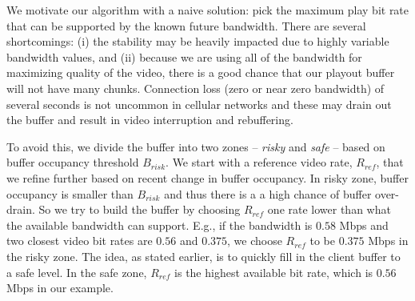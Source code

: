 We motivate our algorithm with a naive solution: pick the maximum
 play bit rate that can be supported by the known future bandwidth. 
There are several shortcomings: (i) the stability may be heavily
impacted due to highly variable bandwidth values, and (ii)
because we are using all of the bandwidth for maximizing quality of
the video, there is a good chance that our playout buffer will not
have many chunks. 
Connection loss (zero or near zero bandwidth) of several seconds is
not uncommon in  cellular networks and these may drain out the buffer
and result in video interruption and rebuffering.

To avoid this, we divide the
buffer into two zones -- \emph{risky} and \emph{safe} -- based on
buffer occupancy 
threshold $B_{risk} $. 
We start with a reference video rate, $R_{ref}$, that we refine
further based on recent change in buffer occupancy.
In risky zone, buffer occupancy is smaller than
$B_{risk}$ and thus there is a
a high chance of buffer over-drain. So we try to build the buffer by
choosing $R_{ref}$ one rate lower than what the available bandwidth
can support. 
E.g., if the bandwidth is $0.58$ Mbps and two closest video
bit rates are $0.56$ and $0.375$, we choose $R_{ref}$ to be $ 0.375$
Mbps in the risky zone. 
The idea, as stated earlier, is to quickly 
fill in the client buffer to a safe level.
In the safe zone,  $R_{ref}$ is the highest available bit rate, which
is $0.56$ Mbps in our 
example. 

